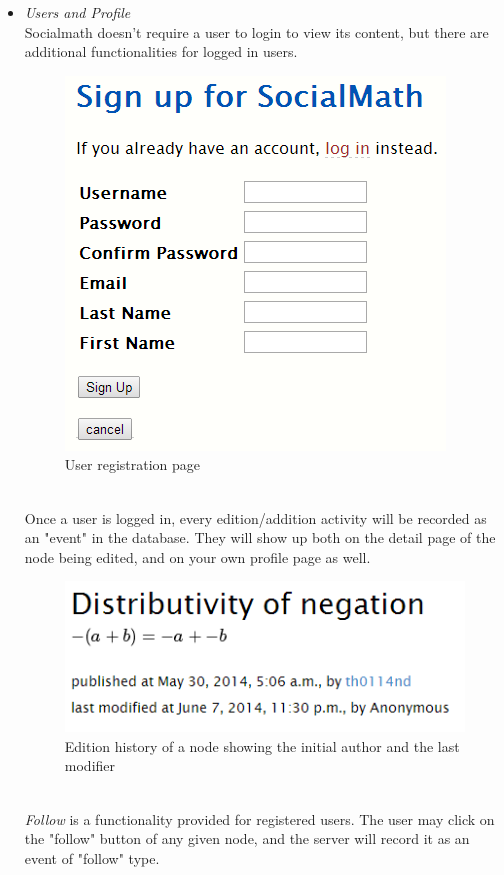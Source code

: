 \documentclass{acm_proc_article-sp}
\begin{document}
\begin{itemize}
\item \emph{Users and Profile} \\
Socialmath doesn't require a user to login to view its content, but there are additional functionalities for logged in users. 
\begin{figure}[h!]
\centering
\includegraphics[scale=0.15]{signup.png}
\caption{User registration page}
\end{figure}\\
Once a user is logged in, every edition/addition activity will be recorded as an "event" in the database. They will show up both on the detail page of the node being edited, and on your own profile page as well. 
\begin{figure}[h!]
\centering
\includegraphics[scale=0.6]{edit_history.png}
\caption{Edition history of a node showing the initial author and the last modifier}
\end{figure}\\
\emph{Follow} is a functionality provided for registered users. The user may click on the "follow" button of any given node, and the server will record it as an event of "follow" type. 
\begin{figure}[h!]
\centering

\end{figure}
\end{itemize}
\end{document}
